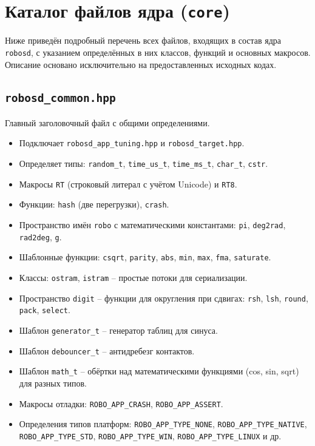 \documentclass[a4paper,12pt]{article}
\begin{document}
\section{Каталог файлов ядра (\texttt{core})}

Ниже приведён подробный перечень всех файлов, входящих в состав ядра \texttt{robosd}, с указанием определённых в них классов, функций и основных макросов. Описание основано исключительно на предоставленных исходных кодах.

\subsection{\texttt{robosd\_common.hpp}}

Главный заголовочный файл с общими определениями.

\begin{itemize}
    \item Подключает \texttt{robosd\_app\_tuning.hpp} и \texttt{robosd\_target.hpp}.
    \item Определяет типы: \texttt{random\_t}, \texttt{time\_us\_t}, \texttt{time\_ms\_t}, \texttt{char\_t}, \texttt{cstr}.
    \item Макросы \texttt{RT} (строковый литерал с учётом Unicode) и \texttt{RT8}.
    \item Функции: \texttt{hash} (две перегрузки), \texttt{crash}.
    \item Пространство имён \texttt{robo} с математическими константами: \texttt{pi}, \texttt{deg2rad}, \texttt{rad2deg}, \texttt{g}.
    \item Шаблонные функции: \texttt{csqrt}, \texttt{parity}, \texttt{abs}, \texttt{min}, \texttt{max}, \texttt{fma}, \texttt{saturate}.
    \item Классы: \texttt{ostram}, \texttt{istram} -- простые потоки для сериализации.
    \item Пространство \texttt{digit} -- функции для округления при сдвигах: \texttt{rsh}, \texttt{lsh}, \texttt{round}, \texttt{pack}, \texttt{select}.
    \item Шаблон \texttt{generator\_t} -- генератор таблиц для синуса.
    \item Шаблон \texttt{debouncer\_t} -- антидребезг контактов.
    \item Шаблон \texttt{math\_t} -- обёртки над математическими функциями (cos, sin, sqrt) для разных типов.
    \item Макросы отладки: \texttt{ROBO\_APP\_CRASH}, \texttt{ROBO\_APP\_ASSERT}.
    \item Определения типов платформ: \texttt{ROBO\_APP\_TYPE\_NONE}, \texttt{ROBO\_APP\_TYPE\_NATIVE}, \texttt{ROBO\_APP\_TYPE\_STD}, \texttt{ROBO\_APP\_TYPE\_WIN}, \texttt{ROBO\_APP\_TYPE\_LINUX} и др.
\end{itemize}
\end{document}
